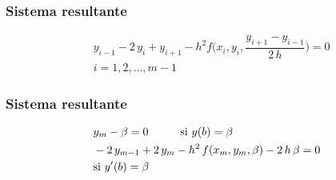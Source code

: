 \documentclass[12pt]{beamer}
\begin{document}
\begin{frame}
\frametitle{Sistema resultante}
\begin{align}
&{}y_{i-1} - 2 \, y_{i} + y_{i+1} - h^{2}  f \bigg( x_{i}, y_{i}, \dfrac{y_{i+1} - y_{i-1}}{2 \, h} \bigg) = 0 \label{eq:ecuacion_08_11_b}\\
&{}i = 1, 2, \ldots, m-1 \nonumber
\end{align}
\end{frame}
\begin{frame}
\frametitle{Sistema resultante}
\begin{eqnarray}
\begin{aligned}
&y_{m} - \beta = 0 \hspace{1cm} \text{si } y (b) = \beta \\
&-2 \, y_{m-1} + 2 \, y_{m} - h^{2} \, f (x_{m}, y_{m}, \beta) - 2 \, h \, \beta = 0 \\
&\text{si } {y}^{\prime} (b) = \beta
\end{aligned}
\label{eq:ecuacion_08_11_c}
\end{eqnarray}
\end{frame}
\end{document}
